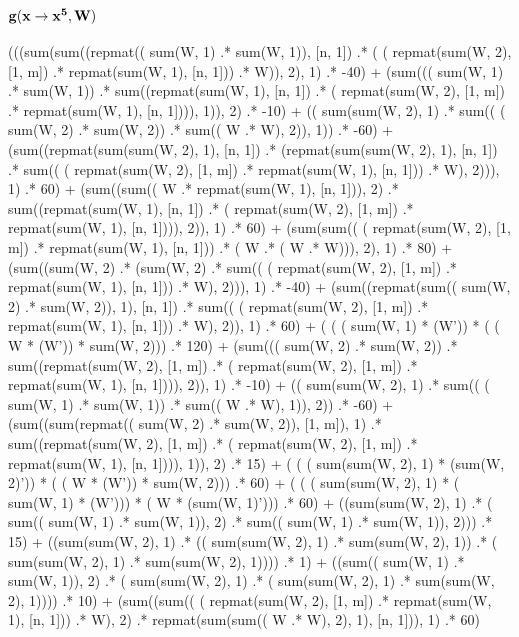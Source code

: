 \documentclass{article}
\begin{document}
\subsection{{$\bf g(x \rightarrow x^5, W)$}}
             (((sum(sum((repmat(( sum(W, 1) .* sum(W, 1)), [n, 1])  .* ( ( repmat(sum(W, 2), [1, m]) .* repmat(sum(W, 1), [n, 1])) .* W)), 2), 1)  .* -40)  
              + (sum((( sum(W, 1) .* sum(W, 1))  .* sum((repmat(sum(W, 1), [n, 1])  .* ( repmat(sum(W, 2), [1, m]) .* repmat(sum(W, 1), [n, 1]))), 1)), 2)  .* -10)  
              + (( sum(sum(W, 2), 1) .* sum(( ( sum(W, 2) .* sum(W, 2)) .* sum(( W .* W), 2)), 1))  .* -60)  
              + (sum((repmat(sum(sum(W, 2), 1), [n, 1])  .* (repmat(sum(sum(W, 2), 1), [n, 1])  .* sum(( ( repmat(sum(W, 2), [1, m]) .* repmat(sum(W, 1), [n, 1])) .* W), 2))), 1)  .* 60)  
              + (sum((sum(( W .* repmat(sum(W, 1), [n, 1])), 2)  .* sum((repmat(sum(W, 1), [n, 1])  .* ( repmat(sum(W, 2), [1, m]) .* repmat(sum(W, 1), [n, 1]))), 2)), 1)  .* 60)  
              + (sum(sum(( ( repmat(sum(W, 2), [1, m]) .* repmat(sum(W, 1), [n, 1])) .* ( W .* ( W .* W))), 2), 1)  .* 80)  
              + (sum((sum(W, 2)  .* (sum(W, 2)  .* sum(( ( repmat(sum(W, 2), [1, m]) .* repmat(sum(W, 1), [n, 1])) .* W), 2))), 1)  .* -40)  
              + (sum((repmat(sum(( sum(W, 2) .* sum(W, 2)), 1), [n, 1])  .* sum(( ( repmat(sum(W, 2), [1, m]) .* repmat(sum(W, 1), [n, 1])) .* W), 2)), 1)  .* 60)  
              + ( ( ( sum(W, 1) * (W')) * ( ( W * (W')) * sum(W, 2))) .* 120)  
              + (sum((( sum(W, 2) .* sum(W, 2))  .* sum((repmat(sum(W, 2), [1, m])  .* ( repmat(sum(W, 2), [1, m]) .* repmat(sum(W, 1), [n, 1]))), 2)), 1)  .* -10)  
              + (( sum(sum(W, 2), 1) .* sum(( ( sum(W, 1) .* sum(W, 1)) .* sum(( W .* W), 1)), 2))  .* -60)  
              + (sum((sum(repmat(( sum(W, 2) .* sum(W, 2)), [1, m]), 1)  .* sum((repmat(sum(W, 2), [1, m])  .* ( repmat(sum(W, 2), [1, m]) .* repmat(sum(W, 1), [n, 1]))), 1)), 2)  .* 15)  
              + ( ( ( sum(sum(W, 2), 1) * (sum(W, 2)')) * ( ( W * (W')) * sum(W, 2))) .* 60)  
              + ( ( ( sum(sum(W, 2), 1) * ( sum(W, 1) * (W'))) * ( W * (sum(W, 1)'))) .* 60)  
              + ((sum(sum(W, 2), 1)  .* ( sum(( sum(W, 1) .* sum(W, 1)), 2) .* sum(( sum(W, 1) .* sum(W, 1)), 2)))  .* 15)  
              + ((sum(sum(W, 2), 1)  .* (( sum(sum(W, 2), 1) .* sum(sum(W, 2), 1))  .* ( sum(sum(W, 2), 1) .* sum(sum(W, 2), 1))))  .* 1)  
              + ((sum(( sum(W, 1) .* sum(W, 1)), 2)  .* ( sum(sum(W, 2), 1) .* ( sum(sum(W, 2), 1) .* sum(sum(W, 2), 1))))  .* 10)  
              + (sum((sum(( ( repmat(sum(W, 2), [1, m]) .* repmat(sum(W, 1), [n, 1])) .* W), 2)  .* repmat(sum(sum(( W .* W), 2), 1), [n, 1])), 1)  .* 60)  
\end{document}
